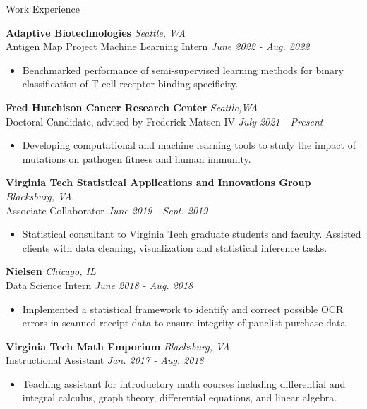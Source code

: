 \documentclass{resume} %
\begin{document}
\begin{rSection}{Work Experience}

{\bf Adaptive Biotechnologies} \hfill {\em Seattle, WA}\\
{Antigen Map Project Machine Learning Intern} \hfill {\em June 2022 - Aug. 2022}
\begin{itemize}
    \item Benchmarked performance of semi-supervised learning methods for binary classification of T cell receptor binding specificity.
\end{itemize}

{\bf Fred Hutchison Cancer Research Center} \hfill { \em Seattle,WA}\\
{Doctoral Candidate, advised by Frederick Matsen IV} \hfill {\em July 2021 - Present}
\begin{itemize}
    \item Developing computational and machine learning tools to study the impact of mutations on pathogen fitness and human immunity.
\end{itemize}

{\bf Virginia Tech Statistical Applications and Innovations Group} \hfill {\em Blacksburg, VA} \\
{Associate Collaborator} \hfill {\em June 2019 - Sept. 2019}
\begin{itemize}
    \item Statistical consultant to Virginia Tech graduate students and faculty.
    Assisted clients with data cleaning, visualization and statistical inference tasks.
\end{itemize}

{\bf Nielsen} \hfill {\em Chicago, IL} \\
{Data Science Intern} \hfill {\em June 2018 - Aug. 2018}
\begin{itemize}
    \item Implemented a statistical framework to identify and correct possible OCR errors in scanned receipt data to ensure integrity of panelist purchase data.
\end{itemize}

{\bf Virginia Tech Math Emporium} \hfill {\em Blacksburg, VA} \\
{Instructional Assistant} \hfill {\em Jan. 2017 - Aug. 2018}
\begin{itemize}
    \item Teaching assistant for introductory math courses including differential and integral calculus, graph theory, differential equations, and linear algebra.
\end{itemize}
\end{rSection}
\end{document}

